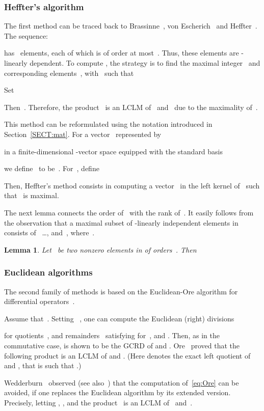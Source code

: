 \documentclass{sig-alt-full}
\newtheorem{lemma}[theorem]{Lemma}
\begin{document}
\subsubsection{Heffter's algorithm} 
The first method can be traced back to Brassinne~\cite{Brassinne1864}, von Escherich~\cite{Escherich1883} and Heffter~\cite{Heffter1896}.
The sequence:

has~ elements, each of which is of order at most~.
Thus, these elements are -linearly dependent. To compute , the strategy is to 
find the maximal integer~ and corresponding elements~, 
with~ such that

Set

Then~. Therefore, the product~ is an LCLM of~ and~ due to the maximality of~.

This method can be reformulated using the notation introduced in Section~\ref{SECT:mat}.
For a vector~ represented by

in a finite-dimensional -vector space equipped with the standard basis

\sloppy we define~ to be~.
For~, define

Then, Heffter's method consists in computing a vector~ in the left kernel of~
such that~ is maximal.

The next lemma connects the order of~ with the rank of~. 
It easily follows from the observation that a maximal subset of
-linearly independent elements in~
consists of~ \ldots,  and~, where~.
\begin{lemma} \label{LM:prank}
Let~ be two nonzero elements in  of orders~.
Then 
\end{lemma}

\subsubsection{Euclidean algorithms}
The second family of methods is based on the Euclidean-Ore algorithm for differential operators~\cite{Ore33}. 

\medskip {} Assume that~. Setting~ , one can compute the Euclidean (right) divisions 

for quotients~, and remainders~ satisfying  for~, and . Then, as in the commutative case,  is shown to be the GCRD of  and . 
Ore~\cite[\S2]{Ore33} proved that the following product 
 is an LCLM of  and . (Here  denotes the exact left quotient of  and , that is  such that .)

\medskip {} Wedderburn~\cite[\S7-8]{Wedderburn1932} observed (see also~\cite{BrPe94})
that the
computation of~\eqref{eq:Ore} can be avoided, if one replaces the Euclidean
algorithm by its extended version. Precisely, letting , , and
   the product~ is an LCLM of~ and~.
\end{document}
